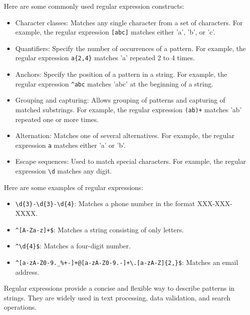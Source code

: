 \documentclass[letterpaper,12pt]{article}
\begin{document}
Here are some commonly used regular expression constructs:
\begin{itemize}
      \item Character classes: Matches any single character from a set of characters. For example, the regular expression \verb|[abc]| matches either 'a', 'b', or 'c'.
      \item Quantifiers: Specify the number of occurrences of a pattern. For example, the regular expression \verb|a{2,4}| matches 'a' repeated 2 to 4 times.
      \item Anchors: Specify the position of a pattern in a string. For example, the regular expression \verb|^abc| matches 'abc' at the beginning of a string.
      \item Grouping and capturing: Allows grouping of patterns and capturing of matched substrings. For example, the regular expression \verb|(ab)+| matches 'ab' repeated one or more times.
      \item Alternation: Matches one of several alternatives. For example, the regular expression \verb|a| matches either 'a' or 'b'.
      \item Escape sequences: Used to match special characters. For example, the regular expression \verb|\d| matches any digit.
\end{itemize}

Here are some examples of regular expressions:
\begin{itemize}
      \item \verb|\d{3}-\d{3}-\d{4}|: Matches a phone number in the format XXX-XXX-XXXX.
      \item \verb|^[A-Za-z]+$|: Matches a string consisting of only letters.
      \item \verb|^\d{4}$|: Matches a four-digit number.
      \item \verb|^[a-zA-Z0-9._%+-]+@[a-zA-Z0-9.-]+\.[a-zA-Z]{2,}$|: Matches an email address.
\end{itemize}

Regular expressions provide a concise and flexible way to describe patterns in strings. They are widely used in text processing, data validation, and search operations.
\end{document}
